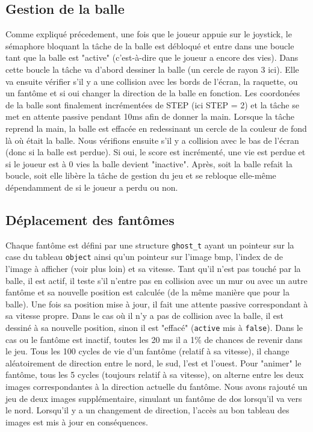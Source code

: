 \documentclass[a4paper]{article}
\begin{document}
\subsection{Gestion de la balle}
Comme expliqué précedement, une fois que le joueur appuie sur le joystick, le sémaphore
bloquant la tâche de la balle est débloqué et entre dans une boucle tant que
la balle est "active" (c'est-à-dire que le joueur a encore des vies). Dans cette boucle
la tâche va d'abord dessiner la balle (un cercle de rayon 3 ici). Elle va ensuite vérifier
s'il y a une collision avec les bords de l'écran, la raquette, ou un fantôme et si oui changer
la direction de la balle en fonction. Les coordonées de la balle sont finalement
incrémentées de STEP (ici STEP = 2) et la tâche se met en attente passive pendant
10ms afin de donner la main.
\newline
Lorsque la tâche reprend la main, la balle est effacée en redessinant un cercle
de la couleur de fond là où était la balle. Nous vérifions ensuite s'il y a collision
avec le bas de l'écran (donc si la balle est perdue). Si oui, le score est incrémenté,
une vie est perdue et si le joueur est à 0 vies la balle devient "inactive". Après,
soit la balle refait la boucle, soit elle libère la tâche de gestion du jeu et se
rebloque elle-même dépendamment de si le joueur a perdu ou non.

\subsection{Déplacement des fantômes}
Chaque fantôme est défini par une structure \texttt{ghost_t} ayant un pointeur sur
la case du tableau \texttt{object} ainsi qu'un pointeur sur l'image bmp, l'index de
de l'image à afficher (voir plus loin) et sa vitesse. Tant qu'il n'est pas touché par la balle,
il est actif, il teste s'il n'entre pas en collision avec un mur ou avec un autre fantôme et
sa nouvelle position est calculée (de la même manière que pour la balle). Une fois sa position
mise à jour, il fait une attente passive correspondant à sa vitesse propre. Dans le cas où il
n'y a pas de collision avec la balle, il est dessiné à sa nouvelle position, sinon il est "effacé"
(\texttt{active} mis à \texttt{false}).
\newline
Dans le cas ou le fantôme est inactif,
toutes les 20 ms il a 1\% de chances de revenir dans le jeu. Tous les 100 cycles de vie d'un
fantôme (relatif à sa vitesse), il change aléatoirement de direction entre le nord,
le sud, l'est et l'ouest. Pour "animer" le fantôme, tous les 5 cycles (toujours relatif à sa
vitesse), on alterne entre les deux images correspondantes à la direction actuelle du fantôme.
Nous avons rajouté un jeu de deux images supplémentaire, simulant un fantôme de dos lorsqu'il
va vers le nord. Lorsqu'il y a un changement de direction, l'accès au bon tableau des images
est mis à jour en conséquences.
\end{document}
